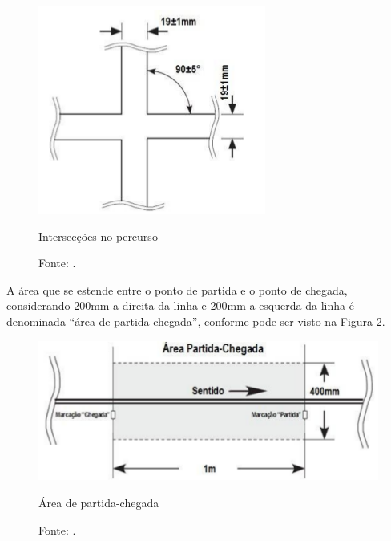 \begin{figure}[h!]
 \centering
 \captionsetup{width=0.37\textwidth,font=footnotesize,textfont=bf}
 \includegraphics[scale=0.6]{figuras/Percurso1.png}
 \caption{Intersecções no percurso \label{fig:percurso1}}
 \vspace{-0.3cm}
 \caption*{Fonte: \cite[p.4]{RegrasRobocore}.}
\end{figure}


 A área que se estende entre o ponto de partida e o ponto de chegada, considerando 200mm a direita da linha e 
 200mm a esquerda da linha
 é denominada ``área de partida-chegada'', conforme pode ser visto na Figura \ref{fig:percurso2}.\par
 

\vspace{0.6cm}
\begin{figure}[h!]
 \centering
 \captionsetup{width=0.55\textwidth,font=footnotesize,textfont=bf}
 \includegraphics[scale=0.5]{figuras/Percurso2.png}
 \caption{Área de partida-chegada \label{fig:percurso2}}
  \vspace{-0.3cm}
 \caption*{Fonte: \cite[p.4]{RegrasRobocore}.}
\end{figure}



